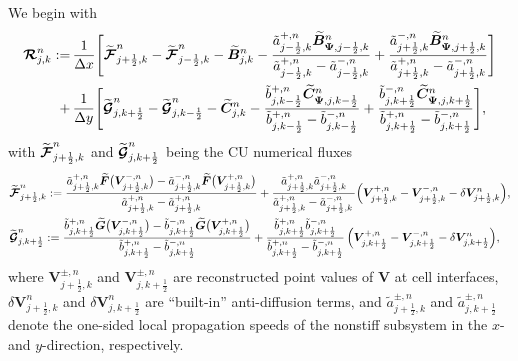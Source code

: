 \documentclass[A4paper,12pt,twoside]{article}
\numberwithin{equation}{section}
\numberwithin{figure}{section}
\numberwithin{table}{section}
\newcommand{\dx}{\Delta x}
\newcommand{\dy}{\Delta y}
\newcommand{\kph}{{k+\frac{1}{2}}}
\newcommand{\kmh}{{k-\frac{1}{2}}}
\newcommand{\jph}{{j+\frac{1}{2}}}
\newcommand{\jmh}{{j-\frac{1}{2}}}
\newcommand{\lore}[1]{{\leavevmode\color{red} #1}}
\begin{document}
We begin with
\begin{equation}
\begin{aligned}
\bm{{\cal R}}_{j,k}^n:=&\,\frac{1}{\dx}\Bigg[\widetilde{\bm{{\cal F}}}_{\jph,k}^n-\widetilde{\bm{{\cal F}}}_{\jmh,k}^n-
\widetilde{\bm B}_{j,k}^n-\frac{\tilde a^{+,n}_{\jmh,k}\widetilde{\bm B}_{\bm\Psi,\jmh,k}^n}
{\tilde a^{+,n}_{\jmh,k}-\tilde a^{-,n}_{\jmh,k}}+
\frac{\tilde a^{-,n}_{\jph,k}\widetilde{\bm B}_{\bm\Psi,\jph,k}^n}{\tilde a^{+,n}_{\jph,k}-\tilde a^{-,n}_{\jph,k}}\Bigg]\\
+&\,\frac{1}{\dy}\Bigg[\widetilde{\bm{{\cal G}}}_{j,\kph}^n-\widetilde{\bm{{\cal G}}}_{j,\kmh}^n-\widetilde{\bm C}_{j,k}^n
-\frac{\tilde b^{+,n}_{j,\kmh}\widetilde{\bm C}_{\bm\Psi,j,\kmh}^n}{\tilde b^{+,n}_{j,\kmh}-\tilde b^{-,n}_{j,\kmh}}+
\frac{\tilde b^{-,n}_{j,\kph}\widetilde{\bm C}_{\bm\Psi,j,\kph}^n}{\tilde b^{+,n}_{j,\kph}-\tilde b^{-,n}_{j,\kph}}\Bigg],
\end{aligned}
\label{3.32}
\end{equation}
\lore{with} $\widetilde{\bm{{\cal F}}}_{\jph,k}^n$ and $\widetilde{\bm{{\cal G}}}_{j,\kph}^n$ \lore{being} %
the CU numerical fluxes
$$
\begin{aligned}
&\widetilde{\bm{{\cal F}}}_{\jph,k}^n:=\frac{\tilde a^{+,n}_{\jph,k}\widetilde{\bm F}\big(\bm V^{-,n}_{\jph,k}\big)-
\tilde a^{-,n}_{\jph,k}\widetilde{\bm F}\big(\bm V^{+,n}_{\jph,k}\big)}{\tilde a^{+,n}_{\jph,k}-\tilde a^{+,n}_{\jph,k}}+
\frac{\tilde a^{+,n}_{\jph,k}\tilde a^{-,n}_{\jph,k}}{\tilde a^{+,n}_{\jph,k}-\tilde a^{-,n}_{\jph,k}\,}
\Big(\bm V^{+,n}_{\jph,k}-\bm V^{-,n}_{\jph,k}-\delta\bm V_{\jph,k}^n\Big),\\
&\widetilde{\bm{{\cal G}}}_{j,\kph}^n:=\frac{\tilde b^{+,n}_{j,\kph}\widetilde{\bm G}\big(\bm V^{-,n}_{j,\kph}\big)-
\tilde b^{-,n}_{j,\kph}\widetilde{\bm G}\big(\bm V^{+,n}_{j,\kph}\big)}{\tilde b^{+,n}_{j,\kph}-\tilde b^{-,n}_{j,\kph}}+
\frac{\tilde b^{+,n}_{j,\kph}\tilde b^{-,n}_{j,\kph}}{\tilde b^{+,n}_{j,\kph}-\tilde b^{-,n}_{j,\kph}}\,
\Big(\bm V^{+,n}_{j,\kph}-\bm V^{-,n}_{j,\kph}-\delta\bm V_{j,\kph}^n\Big),
\end{aligned}
$$
where $\bm V^{\pm,n}_{\jph,k}$ and $\bm V^{\pm,n}_{j,\kph}$ are \lore{reconstructed} point values of $\bm V$ at \lore{cell interfaces},
$\delta\bm V_{\jph,k}^n$ and $\delta\bm V_{j,\kph}^n$ are ``built-in'' anti-diffusion terms, and $\tilde a^{\pm,n}_{\jph,k}$ and
$\tilde a^{\pm,n}_{j,\kph}$ denote the one-sided local propagation speeds of \lore{the nonstiff subsystem} in the $x$- and $y$-direction, respectively.
\end{document}
